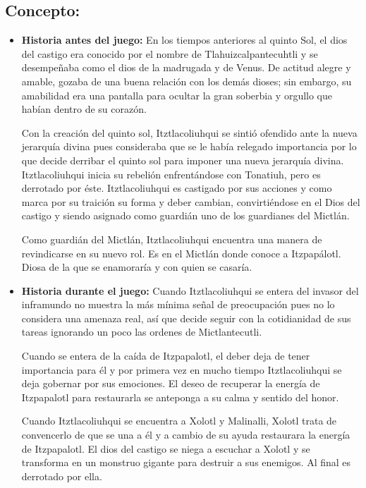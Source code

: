 \subsection{Concepto:}
\begin{itemize}
	\item \textbf{Historia antes del juego:}
	En los tiempos anteriores al quinto Sol, el dios del castigo era conocido por el nombre de Tlahuizcalpantecuhtli y se desempeñaba como el dios de la madrugada y de Venus. De actitud alegre y amable, gozaba de una buena relación con los demás dioses; sin embargo, su amabilidad era una pantalla para ocultar la gran soberbia y orgullo que habían dentro de su corazón.
	\\
	\par
	Con la creación del quinto sol, Itztlacoliuhqui se sintió ofendido ante la nueva jerarquía divina pues consideraba que se le había relegado importancia por lo que decide derribar el quinto sol para imponer una nueva jerarquía divina.  Itztlacoliuhqui inicia su rebelión enfrentándose con Tonatiuh, pero es derrotado por éste.  Itztlacoliuhqui es castigado por sus acciones y como marca por su traición su forma y deber cambian, convirtiéndose en el Dios del castigo y siendo asignado como guardián uno de los guardianes del Mictlán.
	\\
	\par
	Como guardián del Mictlán,  Itztlacoliuhqui encuentra una manera de revindicarse en su nuevo rol. Es en el Mictlán donde conoce a Itzpapálotl. Diosa de la que se enamoraría y con quien se casaría.
	\item \textbf{Historia durante el juego:}
	Cuando Itztlacoliuhqui se entera del invasor del inframundo no muestra la más mínima señal de preocupación pues no lo considera una amenaza real, así que decide seguir con la cotidianidad de sus tareas ignorando un poco las ordenes de Mictlantecutli.
	\\
	\par
	Cuando se entera de la caída de Itzpapalotl, el deber deja de tener importancia para él y por primera vez en mucho tiempo Itztlacoliuhqui se deja gobernar por sus emociones. El deseo de recuperar la energía de Itzpapalotl para restaurarla se anteponga a su calma y sentido del honor.
	\\
	\par
	Cuando Itztlacoliuhqui se encuentra a Xolotl y Malinalli, Xolotl trata de convencerlo de que se una a él y a cambio de su ayuda restaurara la energía de Itzpapalotl. El dios del castigo se niega a escuchar a Xolotl y se transforma en un monstruo gigante para destruir a sus enemigos. Al final es derrotado por ella.

\end{itemize}
